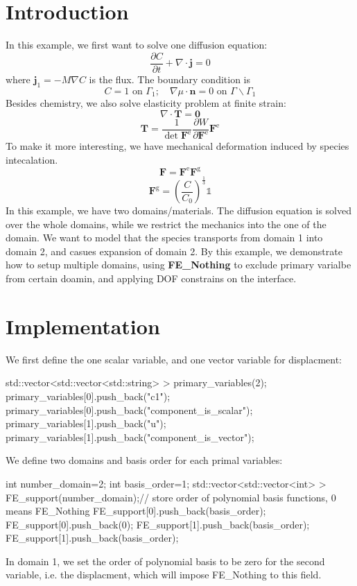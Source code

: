 \hypertarget{growth_Introduction}{}\section{Introduction}\label{growth_Introduction}
In this example, we first want to solve one diffusion equation\-: \[ \frac{\partial C}{\partial t}+\nabla\cdot\boldsymbol{j}=0 \] where $\boldsymbol{j}_1=-M\nabla C$ is the flux. The boundary condition is \[ C=1 \text{ on }\Gamma_1; \quad \nabla \mu\cdot\boldsymbol{n}=0 \text{ on }\Gamma \backslash \Gamma_1 \] Besides chemistry, we also solve elasticity problem at finite strain\-: \[ \nabla\cdot\boldsymbol{T} = \boldsymbol{0} \] \[ \boldsymbol{T}= \frac{1}{\det{\boldsymbol{F}^{\text{e}}}}\frac{\partial W}{\partial \boldsymbol{F}^{\text{e}}}\boldsymbol{F}^{\text{e}} \] To make it more interesting, we have mechanical deformation induced by species intecalation. \[ \boldsymbol{F}=\boldsymbol{F}^{\text{e}}\boldsymbol{F}^{\text{g}} \] \[ \boldsymbol{F}^{\text{g}}=\left(\frac{C}{C_\text{0}}\right)^{\frac{1}{3}}\mathbb{1} \] In this example, we have two domains/materials. The diffusion equation is solved over the whole domains, while we restrict the mechanics into the one of the domain. We want to model that the species transports from domain 1 into domain 2, and casues expansion of domain 2. By this example, we demonstrate how to setup multiple domains, using {\bfseries F\-E\-\_\-\-Nothing} to exclude primary varialbe from certain doamin, and applying D\-O\-F constrains on the interface.\hypertarget{growth_imple}{}\section{Implementation}\label{growth_imple}
We first define the one scalar variable, and one vector variable for displacment\-: 
\begin{DoxyCode}
std::vector<std::vector<std::string> > primary\_variables(2);        
      primary\_variables[0].push\_back(\textcolor{stringliteral}{"c1"}); primary\_variables[0].push\_back(\textcolor{stringliteral}{"component\_is\_scalar"});
      primary\_variables[1].push\_back(\textcolor{stringliteral}{"u"}); primary\_variables[1].push\_back(\textcolor{stringliteral}{"component\_is\_vector"});
\end{DoxyCode}
 We define two domains and basis order for each primal variables\-: 
\begin{DoxyCode}
\textcolor{keywordtype}{int} number\_domain=2;
\textcolor{keywordtype}{int} basis\_order=1;
std::vector<std::vector<int> > FE\_support(number\_domain);\textcolor{comment}{// store order of polynomial basis functions, 0
       means FE\_Nothing   }
FE\_support[0].push\_back(basis\_order);
FE\_support[0].push\_back(0);
FE\_support[1].push\_back(basis\_order);
FE\_support[1].push\_back(basis\_order);
\end{DoxyCode}
 In domain 1, we set the order of polynomial basis to be zero for the second variable, i.\-e. the displacment, which will impose F\-E\-\_\-\-Nothing to this field.

